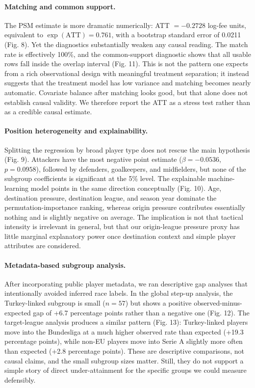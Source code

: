 \documentclass[12pt]{article}
\begin{document}
\paragraph*{Matching and common support.} The PSM estimate is more dramatic numerically: ATT $=-0.2728$ log-fee units, equivalent to $\exp(\mathrm{ATT})=0.761$, with a bootstrap standard error of 0.0211 (Fig. 8). Yet the diagnostics substantially weaken any causal reading. The match rate is effectively 100\%, and the common-support diagnostic shows that all usable rows fall inside the overlap interval (Fig. 11). This is not the pattern one expects from a rich observational design with meaningful treatment separation; it instead suggests that the treatment model has low variance and matching becomes nearly automatic. Covariate balance after matching looks good, but that alone does not establish causal validity. We therefore report the ATT as a stress test rather than as a credible causal estimate.

\paragraph*{Position heterogeneity and explainability.} Splitting the regression by broad player type does not rescue the main hypothesis (Fig. 9). Attackers have the most negative point estimate ($\beta=-0.0536$, $p=0.0958$), followed by defenders, goalkeepers, and midfielders, but none of the subgroup coefficients is significant at the 5\% level. The explainable machine-learning model points in the same direction conceptually (Fig. 10). Age, destination pressure, destination league, and season year dominate the permutation-importance ranking, whereas origin pressure contributes essentially nothing and is slightly negative on average. The implication is not that tactical intensity is irrelevant in general, but that our origin-league pressure proxy has little marginal explanatory power once destination context and simple player attributes are considered.

\paragraph*{Metadata-based subgroup analysis.} After incorporating public player metadata, we ran descriptive gap analyses that intentionally avoided inferred race labels. In the global step-up analysis, the Turkey-linked subgroup is small ($n=57$) but shows a positive observed-minus-expected gap of +6.7 percentage points rather than a negative one (Fig. 12). The target-league analysis produces a similar pattern (Fig. 13): Turkey-linked players move into the Bundesliga at a much higher observed rate than expected (+19.3 percentage points), while non-EU players move into Serie A slightly more often than expected (+2.8 percentage points). These are descriptive comparisons, not causal claims, and the small subgroup sizes matter. Still, they do not support a simple story of direct under-attainment for the specific groups we could measure defensibly.
\end{document}

